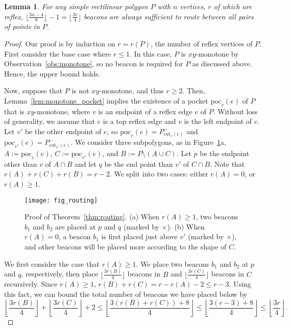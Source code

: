\documentclass[11pt]{article}
\newcommand{\cut}{\ensuremath{\mathrm{cut}}}
\newcommand{\poc}{\ensuremath{\mathrm{poc}}}
\newtheorem{lemma}{Lemma}
\theoremstyle{definition}
\let\geq\geqslant
\let\leq\leqslant
\begin{document}
\begin{lemma}
\label{lem:routing}
 For any simple rectilinear polygon $P$ with $n$ vertices, $r$ of which are reflex,
 $\lfloor \frac{3n-4}{8}\rfloor-1=\lfloor \frac{3r}{4}\rfloor$ beacons are always sufficient
 to route between all pairs of points in $P$. 
\end{lemma}
\begin{proof}
Our proof is by induction on $r = r(P)$, the number of reflex vertices of $P$.
First consider the base case where $r \leq 1$.
In this case, $P$ is $xy$-monotone by Observation~\ref{obs:monotone},
so no beacon is required for $P$ as discussed above.
Hence, the upper bound holds.

Now, suppose that $P$ is not $xy$-monotone, and thus $r \geq 2$.
Then, Lemma~\ref{lem:monotone_pocket} implies the existence of
a pocket $\poc_v(e)$ of $P$ that is $xy$-monotone, where $v$ is an endpoint of a reflex edge $e$ of $P$.
Without loss of generality, we assume that $e$ is a top reflex edge and $v$ is the left endpoint of $e$.
Let $v'$ be the other endpoint of $e$, so
$\poc_v(e) = P^-_{\cut_v(e)}$ and $\poc_{v'}(e) = P^-_{\cut_{v'}(e)}$.
We consider three subpolygons, as in Figure~\ref{fig:routing}a,
$A := \poc_v(e)$, $C := \poc_{v'}(e)$, and $B := P \setminus (A \cup C)$. Let $p$ be the endpoint other than $v$ of $A\cap B$ and let $q$ be the end point than $v'$ of $C\cap B$. Note that $r(A) + r(C) + r(B) = r - 2$.
We split into two cases: either $r(A) = 0$, or $r(A)\geq 1$.

\begin{figure}[tb]
\centering
\texttt{[image: fig\_routing]}
\caption{Proof of Theorem~\ref{thm:routing}. (a) When $r(A) \geq 1$,
two beacons $b_1$ and $b_2$ are placed at $p$ and $q$ (marked by $\times$).
(b) When $r(A) = 0$, a beacon $b_1$ is first placed just above $v'$ (marked by $\times$), and other beacons will be placed more according to the shape of $C$.}
\label{fig:routing}
\end{figure}

We first consider the case that $r(A) \geq 1$. We place two beacons $b_1$ and $b_2$ at $p$ and $q$, respectively, then place $\lfloor \frac{3r(B)}{4}\rfloor$ beacons in $B$ and $\lfloor \frac{3r(C)}{4}\rfloor$ beacons in $C$ recursively. Since $r(A)\geq 1$, $r(B)+r(C)=r-r(A)-2\leq r-3$. Using this fact, we can bound the total number of beacons we have placed below by
\[ \left\lfloor \frac{3r(B)}{4}\right\rfloor + \left\lfloor \frac{3r(C)}{4}\right\rfloor + 2 \leq \left\lfloor \frac{3(r(B)+r(C))+8}{4} \right\rfloor \leq \left\lfloor \frac{3(r-3)+8}{4} \right\rfloor \leq \left\lfloor \frac{3r}{4} \right\rfloor.\]


\end{proof}
\end{document}
